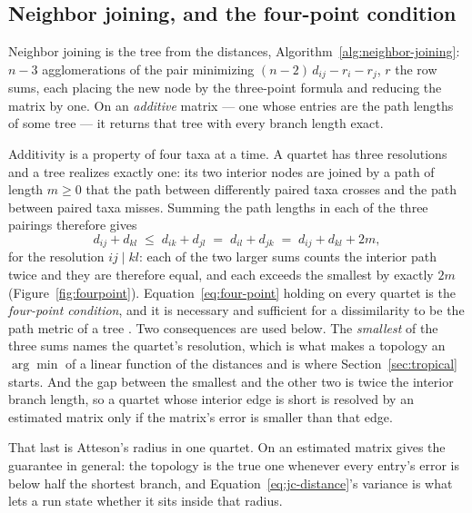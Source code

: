 \documentclass[11pt,a4paper]{article}
\begin{document}
\subsection{Neighbor joining, and the four-point condition}
\label{sec:phylo:nj}
Neighbor joining \citep{saitou1987} is the tree from the distances,
Algorithm~\ref{alg:neighbor-joining}: $n-3$ agglomerations of the pair
minimizing $(n-2)\,d_{ij} - r_i - r_j$, $r$ the row sums, each placing the
new node by the three-point formula and reducing the matrix by one. On an
\emph{additive} matrix --- one whose entries are the path lengths of some
tree --- it returns that tree with every branch length exact.

Additivity is a property of four taxa at a time. A quartet has three
resolutions and a tree realizes exactly one: its two interior nodes are joined
by a path of length $m \ge 0$ that the path between differently paired taxa
crosses and the path between paired taxa misses. Summing the path lengths in
each of the three pairings therefore gives
\begin{equation}
  d_{ij} + d_{kl} \;\le\; d_{ik} + d_{jl} \;=\; d_{il} + d_{jk}
  \;=\; d_{ij} + d_{kl} + 2m,
  \label{eq:four-point}
\end{equation}
for the resolution $ij \mid kl$: each of the two larger sums counts the
interior path twice and they are therefore equal, and each exceeds the
smallest by exactly $2m$ (Figure~\ref{fig:fourpoint}).
Equation~\ref{eq:four-point} holding on every quartet is the \emph{four-point
condition}, and it is necessary and sufficient for a dissimilarity to be the
path metric of a tree \citep{felsenstein2004}. Two consequences are used
below. The \emph{smallest} of the three sums names the quartet's resolution,
which is what makes a topology an $\arg\min$ of a linear function of the
distances and is where Section~\ref{sec:tropical} starts. And the gap between
the smallest and the other two is twice the interior branch length, so a
quartet whose interior edge is short is resolved by an estimated matrix only
if the matrix's error is smaller than that edge.

That last is Atteson's radius in one quartet. On an estimated matrix
\citet{atteson1999} gives the guarantee in general: the topology is the true
one whenever every entry's error is below half the shortest branch, and
Equation~\ref{eq:jc-distance}'s variance is what lets a run state whether it
sits inside that radius.


\end{document}
